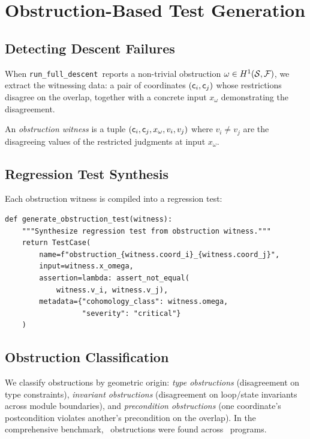 \documentclass[11pt]{article}
\newcommand{\RunDescent}{\texttt{run\_full\_descent}}
\begin{document}
\section{Obstruction-Based Test Generation}\label{sec:obstr-tests}

\subsection{Detecting Descent Failures}
When \RunDescent\ reports a non-trivial obstruction $\omega \in
H^{1}(\mathcal{S}, \mathcal{F})$, we extract the witnessing data: a pair
of coordinates $(\mathsf{c}_i, \mathsf{c}_j)$ whose restrictions disagree on
the overlap, together with a concrete input $x_\omega$ demonstrating
the disagreement.

\begin{definition}\label{def:obstr-witness}
An \emph{obstruction witness} is a tuple $(\mathsf{c}_i, \mathsf{c}_j, x_\omega,
v_i, v_j)$ where $v_i \neq v_j$ are the disagreeing values of the
restricted judgments at input $x_\omega$.
\end{definition}

\subsection{Regression Test Synthesis}
Each obstruction witness is compiled into a regression test:

\begin{lstlisting}[style=jugeo-python]
def generate_obstruction_test(witness):
    """Synthesize regression test from obstruction witness."""
    return TestCase(
        name=f"obstruction_{witness.coord_i}_{witness.coord_j}",
        input=witness.x_omega,
        assertion=lambda: assert_not_equal(
            witness.v_i, witness.v_j),
        metadata={"cohomology_class": witness.omega,
                  "severity": "critical"}
    )
\end{lstlisting}

\subsection{Obstruction Classification}
We classify obstructions by geometric origin: \emph{type obstructions}
(disagreement on type constraints), \emph{invariant obstructions}
(disagreement on loop/state invariants across module boundaries), and
\emph{precondition obstructions} (one coordinate's postcondition violates
another's precondition on the overlap).  In the comprehensive benchmark,
\compObstructionTotal\ obstructions were found across \compTotalPrograms\
programs.
\end{document}
